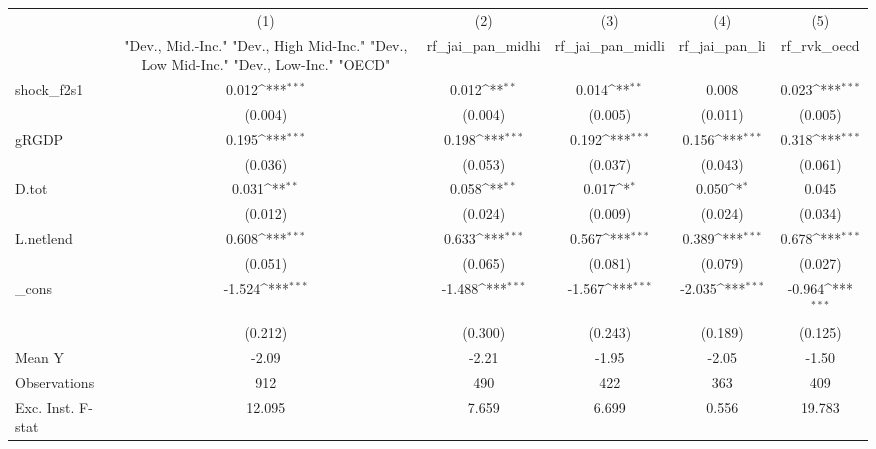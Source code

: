 {
\def\sym#1{\ifmmode^{#1}\else\(^{#1}\)\fi}
\begin{tabular}{l*{5}{c}}
\toprule
            &\multicolumn{1}{c}{(1)}&\multicolumn{1}{c}{(2)}&\multicolumn{1}{c}{(3)}&\multicolumn{1}{c}{(4)}&\multicolumn{1}{c}{(5)}\\
            &\multicolumn{1}{c}{ "Dev., Mid.-Inc." "Dev., High Mid-Inc." "Dev., Low Mid-Inc." "Dev., Low-Inc." "OECD" }&\multicolumn{1}{c}{rf\_jai\_pan\_midhi}&\multicolumn{1}{c}{rf\_jai\_pan\_midli}&\multicolumn{1}{c}{rf\_jai\_pan\_li}&\multicolumn{1}{c}{rf\_rvk\_oecd}\\
\midrule
shock\_f2s1  &       0.012\sym{***}&       0.012\sym{**} &       0.014\sym{**} &       0.008         &       0.023\sym{***}\\
            &     (0.004)         &     (0.004)         &     (0.005)         &     (0.011)         &     (0.005)         \\
\addlinespace
gRGDP       &       0.195\sym{***}&       0.198\sym{***}&       0.192\sym{***}&       0.156\sym{***}&       0.318\sym{***}\\
            &     (0.036)         &     (0.053)         &     (0.037)         &     (0.043)         &     (0.061)         \\
\addlinespace
D.tot       &       0.031\sym{**} &       0.058\sym{**} &       0.017\sym{*}  &       0.050\sym{*}  &       0.045         \\
            &     (0.012)         &     (0.024)         &     (0.009)         &     (0.024)         &     (0.034)         \\
\addlinespace
L.netlend   &       0.608\sym{***}&       0.633\sym{***}&       0.567\sym{***}&       0.389\sym{***}&       0.678\sym{***}\\
            &     (0.051)         &     (0.065)         &     (0.081)         &     (0.079)         &     (0.027)         \\
\addlinespace
\_cons      &      -1.524\sym{***}&      -1.488\sym{***}&      -1.567\sym{***}&      -2.035\sym{***}&      -0.964\sym{***}\\
            &     (0.212)         &     (0.300)         &     (0.243)         &     (0.189)         &     (0.125)         \\
\midrule
Mean Y      &       -2.09         &       -2.21         &       -1.95         &       -2.05         &       -1.50         \\
Observations&         912         &         490         &         422         &         363         &         409         \\
Exc. Inst. F-stat&      12.095         &       7.659         &       6.699         &       0.556         &      19.783         \\
\bottomrule
\end{tabular}
}
